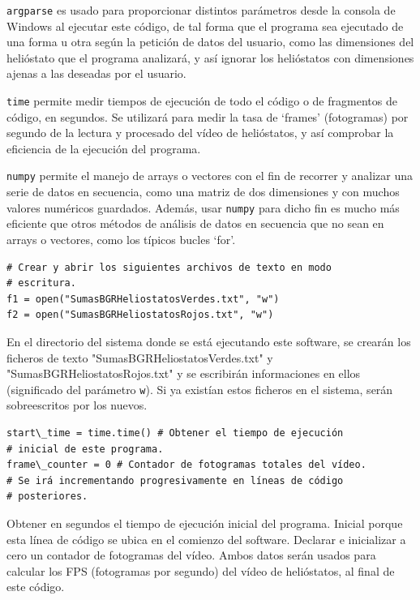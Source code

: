 \verb|argparse| es usado para proporcionar distintos parámetros desde la consola de Windows al ejecutar este código, de tal forma que el programa sea ejecutado de una forma u otra según la petición de datos del usuario, como las dimensiones del helióstato que el programa analizará, y así ignorar los helióstatos con dimensiones ajenas a las deseadas por el usuario.

\verb|time| permite medir tiempos de ejecución de todo el código o de fragmentos de código, en segundos. Se utilizará para medir la tasa de ‘frames’ (fotogramas) por segundo de la lectura y procesado del vídeo de helióstatos, y así comprobar la eficiencia de la ejecución del programa.

\verb|numpy| permite el manejo de arrays o vectores con el fin de recorrer y analizar una serie de datos en secuencia, como una matriz de dos dimensiones y con muchos valores numéricos guardados. Además, usar \verb|numpy| para dicho fin es mucho más eficiente que otros métodos de análisis de datos en secuencia que no sean en arrays o vectores, como los típicos bucles ‘for’.

\begin{lstlisting}
# Crear y abrir los siguientes archivos de texto en modo
# escritura.
f1 = open("SumasBGRHeliostatosVerdes.txt", "w")
f2 = open("SumasBGRHeliostatosRojos.txt", "w")
\end{lstlisting}

En el directorio del sistema donde se está ejecutando este software, se crearán los ficheros de texto "SumasBGRHeliostatosVerdes.txt" y "SumasBGRHeliostatosRojos.txt" y se escribirán informaciones en ellos (significado del parámetro \verb|w|). Si ya existían estos ficheros en el sistema, serán sobreescritos por los nuevos.

\begin{lstlisting}
start\_time = time.time() # Obtener el tiempo de ejecución
# inicial de este programa.
frame\_counter = 0 # Contador de fotogramas totales del vídeo.
# Se irá incrementando progresivamente en líneas de código
# posteriores.
\end{lstlisting}

Obtener en segundos el tiempo de ejecución inicial del programa. Inicial porque esta línea de código se ubica en el comienzo del software. Declarar e inicializar a cero un contador de fotogramas del vídeo. Ambos datos serán usados para calcular los FPS (fotogramas por segundo) del vídeo de helióstatos, al final de este código.

